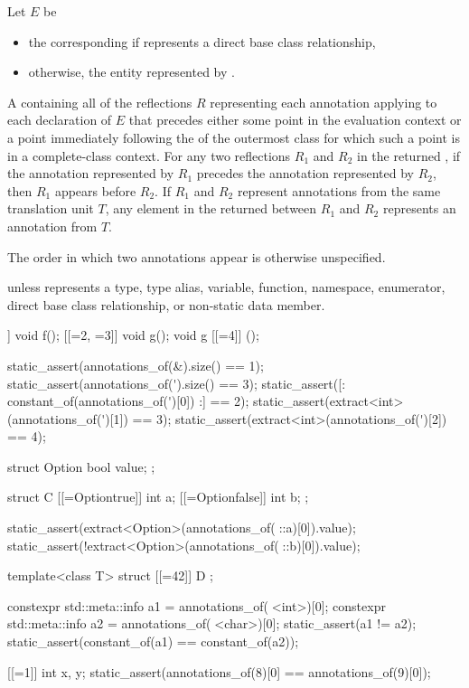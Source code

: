 \begin{itemdescr}
\pnum
Let $E$ be
\begin{itemize}
\item
  the corresponding 
  if  represents a direct base class relationship,
\item
  otherwise, the entity represented by .
\end{itemize}

\pnum
\returns
A  containing all of the reflections $R$
representing each annotation applying to each declaration of $E$ that precedes either
some point in the evaluation context or
a point immediately following the 
of the outermost class for which such a point is in a complete-class context.
For any two reflections $R_1$ and $R_2$ in the returned ,
if the annotation represented by $R_1$ precedes the annotation represented by $R_2$,
then $R_1$ appears before $R_2$.
If $R_1$ and $R_2$ represent annotations from the same translation unit $T$,
any element in the returned  between $R_1$ and $R_2$
represents an annotation from $T$.
\begin{note}
The order in which two annotations appear is otherwise unspecified.
\end{note}

\pnum
\throws
{} unless
 represents a
type,
type alias,
variable,
function,
namespace,
enumerator,
direct base class relationship, or
non-static data member.

\pnum
\begin{example}
\begin{codeblock}
[[=1]] void f();
[[=2, =3]] void g();
void g [[=4]] ();

static_assert(annotations_of(^^f).size() == 1);
static_assert(annotations_of(^^g).size() == 3);
static_assert([: constant_of(annotations_of(^^g)[0]) :] == 2);
static_assert(extract<int>(annotations_of(^^g)[1]) == 3);
static_assert(extract<int>(annotations_of(^^g)[2]) == 4);

struct Option { bool value; };

struct C {
  [[=Option{true}]] int a;
  [[=Option{false}]] int b;
};

static_assert(extract<Option>(annotations_of(^^C::a)[0]).value);
static_assert(!extract<Option>(annotations_of(^^C::b)[0]).value);

template<class T>
  struct [[=42]] D { };

constexpr std::meta::info a1 = annotations_of(^^D<int>)[0];
constexpr std::meta::info a2 = annotations_of(^^D<char>)[0];
static_assert(a1 != a2);
static_assert(constant_of(a1) == constant_of(a2));

[[=1]] int x, y;
static_assert(annotations_of(^^x)[0] == annotations_of(^^y)[0]);
\end{codeblock}
\end{example}
\end{itemdescr}

